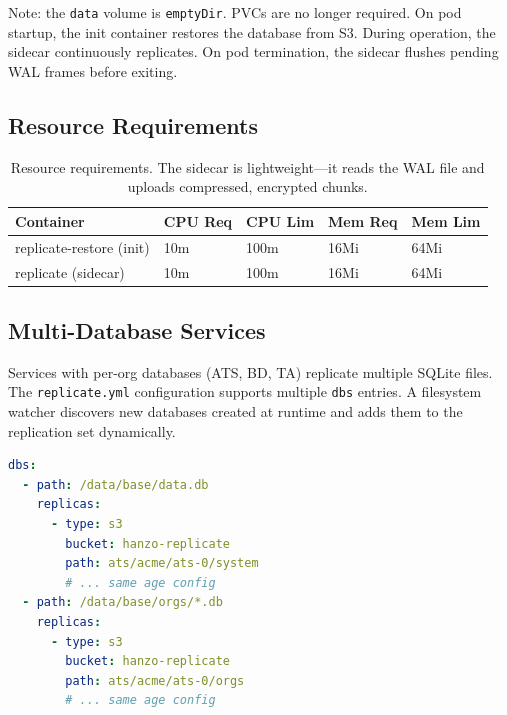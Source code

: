 Note: the \texttt{data} volume is \texttt{emptyDir}. PVCs are no longer
required. On pod startup, the init container restores the database from S3.
During operation, the sidecar continuously replicates. On pod termination,
the sidecar flushes pending WAL frames before exiting.

\subsection{Resource Requirements}

\begin{table}[H]
\centering
\begin{tabular}{@{}lllll@{}}
\toprule
\textbf{Container} & \textbf{CPU Req} & \textbf{CPU Lim} & \textbf{Mem Req} & \textbf{Mem Lim} \\
\midrule
replicate-restore (init) & 10m   & 100m  & 16Mi  & 64Mi \\
replicate (sidecar)      & 10m   & 100m  & 16Mi  & 64Mi \\
\bottomrule
\end{tabular}
\caption{Resource requirements. The sidecar is lightweight---it reads the WAL file
and uploads compressed, encrypted chunks.}
\label{tab:resources}
\end{table}

\subsection{Multi-Database Services}

Services with per-org databases (ATS, BD, TA) replicate multiple SQLite
files. The \texttt{replicate.yml} configuration supports multiple
\texttt{dbs} entries. A filesystem watcher discovers new databases created at
runtime and adds them to the replication set dynamically.

\begin{lstlisting}[language=YAML,caption={Multi-database configuration.}]
dbs:
  - path: /data/base/data.db
    replicas:
      - type: s3
        bucket: hanzo-replicate
        path: ats/acme/ats-0/system
        # ... same age config
  - path: /data/base/orgs/*.db
    replicas:
      - type: s3
        bucket: hanzo-replicate
        path: ats/acme/ats-0/orgs
        # ... same age config
\end{lstlisting}

